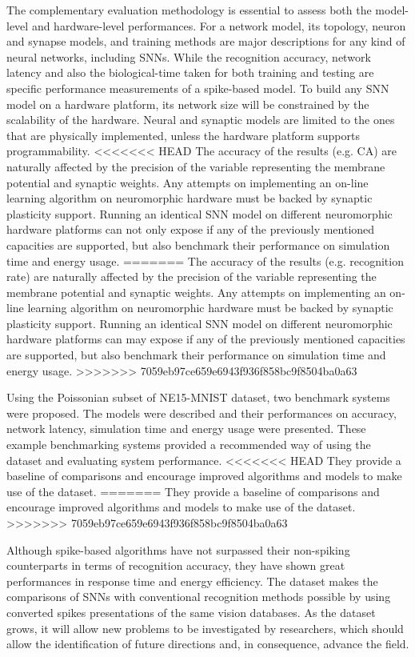 The complementary evaluation methodology is essential to assess both the model-level and hardware-level performances.
For a network model, its topology, neuron and synapse models, and training methods are major descriptions for any kind of neural networks, including SNNs.
While the recognition accuracy, network latency and also the biological-time taken for both training and testing are specific performance measurements of a spike-based model.
To build any SNN model on a hardware platform, its network size will be constrained by the scalability of the hardware. Neural and synaptic models are limited to the ones that are physically implemented, unless the hardware platform supports programmability.
<<<<<<< HEAD
The accuracy of the results (e.g. CA) are naturally affected by the precision of the variable representing the membrane potential and synaptic weights.
Any attempts on implementing an on-line learning algorithm on neuromorphic hardware must be backed by synaptic plasticity support.
Running an identical SNN model on different neuromorphic hardware platforms can not only expose if any of the previously mentioned capacities are supported, but also benchmark their performance on simulation time and energy usage.
=======
The accuracy of the results (e.g. recognition rate) are naturally affected by the precision of the variable representing the membrane potential and synaptic weights.
Any attempts on implementing an on-line learning algorithm on neuromorphic hardware must be backed by synaptic plasticity support.
Running an identical SNN model on  different neuromorphic hardware platforms can may expose if any of the previously mentioned capacities are supported, but also benchmark their performance on simulation time and energy usage.
>>>>>>> 7059eb97ce659e6943f936f858bc9f8504ba0a63


Using the Poissonian subset of NE15-MNIST dataset, two benchmark systems were proposed. 
The models were described and their performances on accuracy, network latency, simulation time and energy usage were presented.
These example benchmarking systems provided a recommended way of using the dataset and evaluating system performance.
<<<<<<< HEAD
They provide a baseline of comparisons and encourage improved algorithms and models to make use of the dataset.
=======
They provide a baseline of comparisons and encourage improved algorithms and models to make use of the dataset. 
>>>>>>> 7059eb97ce659e6943f936f858bc9f8504ba0a63

Although spike-based algorithms have not surpassed their non-spiking counterparts in terms of recognition accuracy, they have shown great performances in response time and energy efficiency.
The dataset makes the comparisons of SNNs with conventional recognition methods possible by using converted spikes presentations of the same vision databases.
As the dataset grows, it will allow new problems to be investigated by researchers, which should allow the identification of future directions and, in consequence, advance the field.

